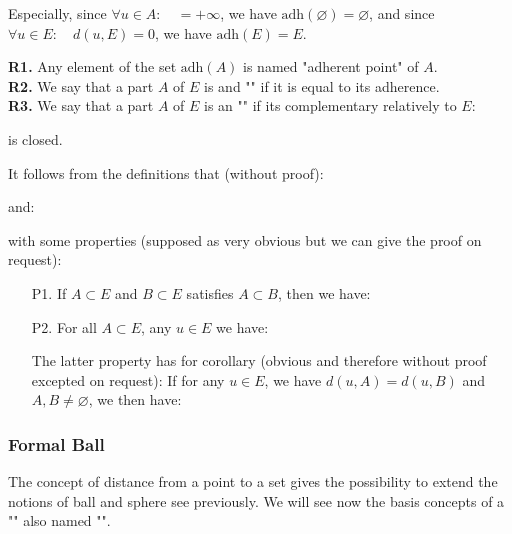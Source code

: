 \begin{enumerate}
		Especially, since $\forall u\in A:\quad =+\infty$, we have $\text{adh}(\varnothing)=\varnothing$, and since $\forall u\in E:\quad d(u,E)=0$, we have $\text{adh}(E)=E$.
		
		\begin{tcolorbox}[title=Remarks,colframe=black,arc=10pt]
		\textbf{R1.} Any element of the set $\text{adh}(A)$ is named "adherent point" of $A$.\\
		
		\textbf{R2.} We say that a part $A$ of $E$ is and "" if it is equal to its adherence.\\
		
		\textbf{R3.} We say that a part $A$ of $E$ is an "" if its complementary relatively to $E$:
		
		is closed.
		\end{tcolorbox}	
	\end{enumerate}
	It follows from the definitions that (without proof):
	
	and:
	
	with some properties (supposed as very obvious but we can give the proof on request):
	\begin{enumerate}
		\item[P1.] If $A\subset E$ and $B\subset E$ satisfies $A\subset B$, then we have:
		
		
		\item[P2.] For all $A\subset E$, any $u\in E$ we have:
		
		The latter property has for corollary (obvious and therefore without proof excepted on request):
		If for any $u\in E$, we have $d(u,A)=d(u,B)$ and $A,B\neq \varnothing$, we then have:
		
	\end{enumerate}
	
	\subsubsection{Formal Ball}
	The concept of distance from a point to a set gives the possibility to extend the notions of ball and sphere see previously. We will see now the basis concepts of a "" also named "".
	
